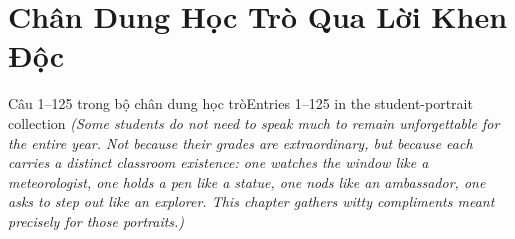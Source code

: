 \chapter{Chân Dung Học Trò Qua Lời Khen Độc}

\begin{truyen}{Câu 1–125 trong bộ chân dung học trò}{Entries 1–125 in the student-portrait collection}
\textit{(Some students do not need to speak much to remain unforgettable for the entire year. Not because their grades are extraordinary, but because each carries a distinct classroom existence: one watches the window like a meteorologist, one holds a pen like a statue, one nods like an ambassador, one asks to step out like an explorer. This chapter gathers witty compliments meant precisely for those portraits.)}
\end{truyen}

